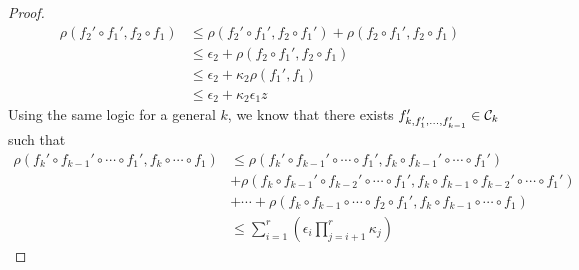 \begin{proof}
\begin{align}
   \rho\left(f_2' \circ f_1', f_2 \circ f_1\right) &\leq \rho\left(f_2' \circ f_1', f_2 \circ f_1'\right) + \rho\left(f_2 \circ f_1', f_2 \circ f_1\right) \\ 
   &\leq \epsilon_2 + \rho\left(f_2 \circ f_1', f_2 \circ f_1\right) \\ 
   &\leq \epsilon_2 + \kappa_2 \rho\left(f_1', f_1\right) \\ 
   &\leq \epsilon_2 + \kappa_2\epsilon_1z
\end{align}
Using the same logic for a general $k$, we know that there exists $f_{k,f_1',\dots,f_{k-1}'}' \in \mathcal C_k$ such that
\begin{align}
    \rho\left(f_k' \circ f_{k-1}' \circ \cdots \circ f_1', f_k \circ \cdots \circ f_1\right) &\leq \rho\left(f_k' \circ f_{k-1}'\circ \cdots \circ f_1', f_k \circ f_{k-1}'\circ \cdots \circ f_1' \right) \\ 
    &+ \rho\left(f_k \circ f_{k-1}'\circ f_{k-2}' \circ \cdots \circ f_1', f_k \circ f_{k-1}\circ f_{k-2}' \circ \cdots \circ f_1'\right) \\ &+ \cdots + \rho\left(f_k \circ f_{k-1}\circ \cdots \circ f_2 \circ f_1', f_k \circ f_{k-1}\circ \cdots \circ f_1\right) \\ & \leq \sum_{i=1}^{r} \left(\epsilon_i\prod_{j=i+1}^{r}\kappa_{j}\right)
\end{align}
\end{proof}

